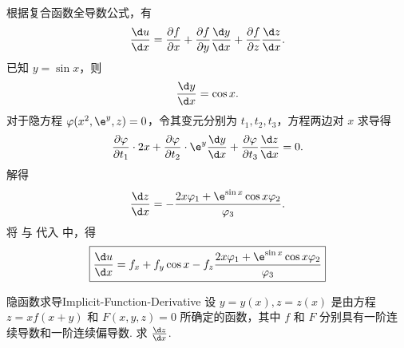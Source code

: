 \begin{solution}
    根据复合函数全导数公式，有
    \begin{equation}
        \label{eq:total-u}
        \frac{\d u}{\d x} = \frac{\partial f}{\partial x} + \frac{\partial f}{\partial y} \frac{\d y}{\d x} + \frac{\partial f}{\partial z} \frac{\d z}{\d x}.
    \end{equation}
    已知 $y = \sin x$，则
    \begin{equation}
        \label{eq:dy-dx}
        \frac{\d y}{\d x} = \cos x.
    \end{equation}
    对于隐方程 $\varphi(x^2, \e^y, z) = 0$，令其变元分别为 $t_1, t_2, t_3$，方程两边对 $x$ 求导得
    \begin{equation}
        \frac{\partial \varphi}{\partial t_1} \cdot 2x + \frac{\partial \varphi}{\partial t_2} \cdot \e^y \frac{\d y}{\d x} + \frac{\partial \varphi}{\partial t_3} \frac{\d z}{\d x} = 0.
    \end{equation}
    解得
    \begin{equation}
        \label{eq:dz-dx}
        \frac{\d z}{\d x} = - \frac{2x \varphi_1 + \e^{\sin x} \cos x \varphi_2}{\varphi_3}.
    \end{equation}
    将  与  代入  中，得
    \begin{equation}
        \boxed{\frac{\d u}{\d x} = f_x + f_y \cos x - f_z \frac{2x \varphi_1 + \e^{\sin x} \cos x \varphi_2}{\varphi_3}}
    \end{equation}
\end{solution}


\begin{problem}{隐函数求导}{Implicit-Function-Derivative}
    设 $y = y(x), z = z(x)$ 是由方程 $z = xf(x+y)$ 和 $F(x,y,z) = 0$ 所确定的函数，其中 $f$ 和 $F$ 分别具有一阶连续导数和一阶连续偏导数. 求 $\frac{\d z}{\d x}$.
\end{problem}

